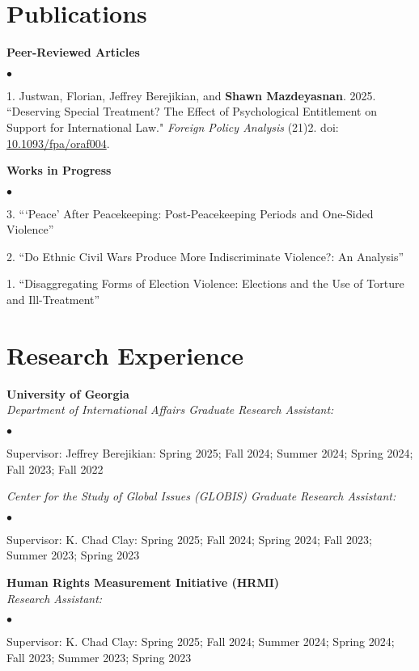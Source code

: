\documentclass[letterpaper,12pt]{article}
\newenvironment{list2}{
  \begin{list}{$\bullet$}{%
      \setlength{\itemsep}{0in}
      \setlength{\parsep}{0in} 
      \setlength{\parskip}{0in}
      \setlength{\topsep}{0in} 
      \setlength{\partopsep}{0in}
      \setlength{\leftmargin}{1in}
      \setlength{\labelsep}{1em}
      \setlength{\labelwidth}{1em}
      \setlength{\itemindent}{-2em}
      \setlength{\listparindent}{2em}}}{\end{list}}
\begin{document}
\section{Publications}
\textbf{Peer-Reviewed Articles}
\par
\begin{list2}
    \item[1.] Justwan, Florian, Jeffrey Berejikian, and \textbf{Shawn Mazdeyasnan}. 2025. ``Deserving Special \mbox{Treatment?} The Effect of Psychological Entitlement on Support for International Law." \textit{\mbox{Foreign} Policy Analysis} (21)2. doi: \href{https://doi.org/10.1093/fpa/oraf004}{10.1093/fpa/oraf004}.
\end{list2}
\par
\textbf{Works in Progress}
\par
\begin{list2}
    \item[3.] ```Peace' After Peacekeeping: Post-Peacekeeping Periods and One-Sided Violence”
    \item[2.] ``Do Ethnic Civil Wars Produce More Indiscriminate Violence?: An Analysis”
    \item[1.] ``Disaggregating Forms of Election Violence: Elections and the Use of Torture and Ill-Treatment” 
\end{list2}

\section{Research Experience}
\textbf{University of Georgia}\\
\textit{Department of International Affairs Graduate Research Assistant:}
\begin{list2}
    \item Supervisor: Jeffrey Berejikian: Spring 2025; Fall 2024; Summer 2024; Spring 2024; Fall 2023; Fall 2022
\end{list2}
\par
\textit{Center for the Study of Global Issues (GLOBIS) Graduate Research Assistant:}
\begin{list2}
    \item Supervisor: K. Chad Clay: Spring 2025; Fall 2024; Spring 2024; Fall 2023; Summer 2023; Spring 2023
\end{list2}
\par
\textbf{Human Rights Measurement Initiative (HRMI)}\\
\textit{Research Assistant:}
\begin{list2}
    \item Supervisor: K. Chad Clay: Spring 2025; Fall 2024; Summer 2024; Spring 2024; Fall 2023; Summer 2023; Spring 2023
\end{list2}
\end{document}
